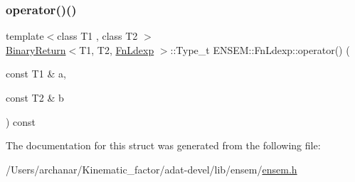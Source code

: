 \subsubsection{\texorpdfstring{operator()()}{operator()()}\hspace{0.1cm}{\footnotesize\ttfamily [3/3]}}
{\footnotesize\ttfamily template$<$class T1 , class T2 $>$ \\
\mbox{\hyperlink{structENSEM_1_1BinaryReturn}{Binary\+Return}}$<$T1, T2, \mbox{\hyperlink{structENSEM_1_1FnLdexp}{Fn\+Ldexp}} $>$\+::Type\+\_\+t E\+N\+S\+E\+M\+::\+Fn\+Ldexp\+::operator() (\begin{DoxyParamCaption}\item[{const T1 \&}]{a,  }\item[{const T2 \&}]{b }\end{DoxyParamCaption}) const\hspace{0.3cm}{\ttfamily [inline]}}



The documentation for this struct was generated from the following file\+:\begin{DoxyCompactItemize}
\item 
/\+Users/archanar/\+Kinematic\+\_\+factor/adat-\/devel/lib/ensem/\mbox{\hyperlink{adat-devel_2lib_2ensem_2ensem_8h}{ensem.\+h}}\end{DoxyCompactItemize}
